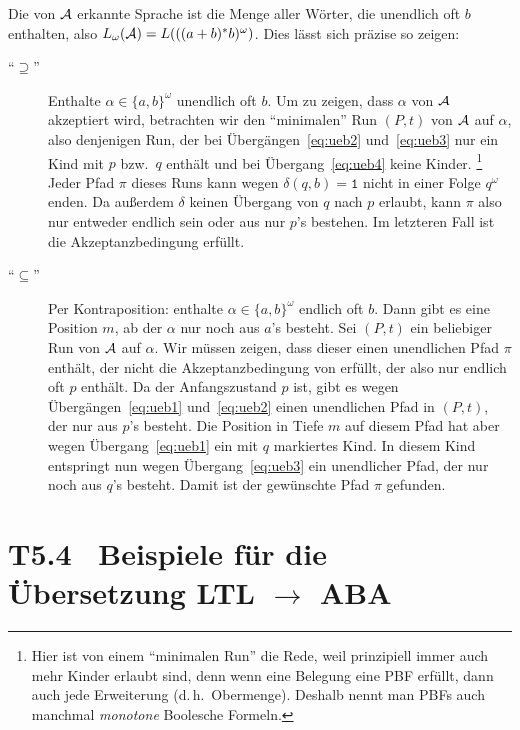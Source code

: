 \documentclass[fontsize=11pt, twoside=false, numbers=autoenddot]{scrbook}
\begin{document}
Die von $\mathcal{A}$ erkannte Sprache ist die Menge aller Wörter,
die unendlich oft $b$ enthalten,
also $L_\omega(\mathcal{A}) = L(((a+b)^*b)^\omega)$.
Dies lässt sich präzise so zeigen:
%
\begin{description}
  \item[{\boldmath"`$\supseteq$"'}]
    Enthalte $\alpha \in \{a,b\}^\omega$ unendlich oft $b$.
    Um zu zeigen, dass $\alpha$ von $\mathcal{A}$ akzeptiert wird,
    betrachten wir den "`minimalen"' Run $(P,t)$ von $\mathcal{A}$ auf $\alpha$,
    also denjenigen Run, der bei Übergängen~\eqref{eq:ueb2} und~\eqref{eq:ueb3}
    nur ein Kind mit $p$ bzw.\ $q$ enthält
    und bei Übergang~\eqref{eq:ueb4} keine Kinder.%
    \footnote{Hier ist von einem "`minimalen Run"' die Rede,
    weil prinzipiell immer auch mehr Kinder erlaubt sind,
    denn wenn eine Belegung eine PBF erfüllt,
    dann auch jede Erweiterung (d.\,h.\ Obermenge).
    Deshalb nennt man PBFs auch manchmal \emph{monotone} Boolesche Formeln.}
    Jeder Pfad $\pi$ dieses Runs kann
    wegen $\delta(q,b) = \texttt{1}$ nicht in einer Folge $q^\omega$ enden.
    Da außerdem $\delta$ keinen Übergang von $q$ nach $p$ erlaubt,
    kann $\pi$ also nur entweder endlich sein oder aus nur $p$'s bestehen.
    Im letzteren Fall ist die Akzeptanzbedingung erfüllt.
    \par\smallskip
  \item[{\boldmath"`$\subseteq$"'}]
    Per Kontraposition:
    enthalte $\alpha \in \{a,b\}^\omega$ endlich oft $b$.
    Dann gibt es eine Position $m$,
    ab der $\alpha$ nur noch aus $a$'s besteht.
    Sei $(P,t)$ ein beliebiger Run von $\mathcal{A}$ auf $\alpha$.
    Wir müssen zeigen, dass dieser einen unendlichen Pfad $\pi$
    enthält, der nicht die Akzeptanzbedingung von \Amc erfüllt,
    der also nur endlich oft $p$ enthält.
    Da der Anfangszustand $p$ ist,
    gibt es wegen Übergängen~\eqref{eq:ueb1} und~\eqref{eq:ueb2} einen
    unendlichen Pfad in $(P,t)$, der nur aus $p$'s besteht.
    Die Position in Tiefe $m$ auf diesem Pfad 
    hat aber wegen Übergang~\eqref{eq:ueb1} ein mit $q$ markiertes Kind.
    In diesem Kind entspringt nun wegen Übergang~\eqref{eq:ueb3}
    ein unendlicher Pfad, der nur noch aus $q$'s besteht.
    Damit ist der gewünschte Pfad $\pi$ gefunden.
\end{description}

\section*{T5.4~ Beispiele für die Übersetzung {\boldmath LTL $\to$ ABA}}
\end{document}
